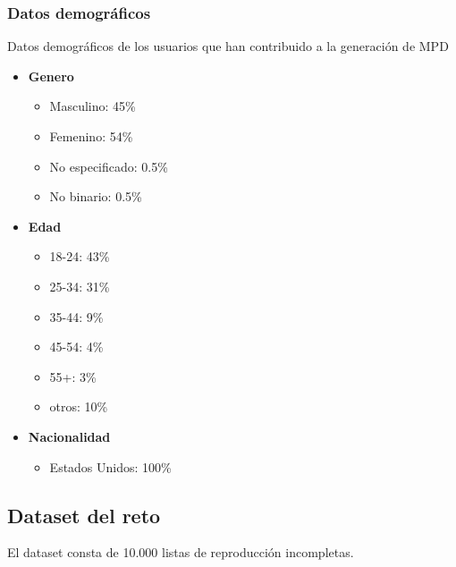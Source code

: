 \documentclass{article}
\begin{document}
	\subsubsection{Datos demográficos}
	Datos demográficos de los usuarios que han contribuido a la generación de MPD
	\begin{itemize}
		\item \textbf{Genero}
		\begin{itemize}
			\item Masculino: 45\%
			\item Femenino: 54\%
			\item No especificado: 0.5\%
			\item No binario: 0.5\%
		\end{itemize}
		\item \textbf{Edad}
		\begin{itemize}
			\item 18-24: 43\%
			\item 25-34: 31\%
			\item 35-44: 9\%
			\item 45-54: 4\%
			\item 55+: 3\%
			\item otros: 10\%
		\end{itemize}
		\item \textbf{Nacionalidad}
		\begin{itemize}
			\item Estados Unidos: 100\%
		\end{itemize}
	\end{itemize}
	 
	\subsection{Dataset del reto}
	El dataset consta de 10.000 listas de reproducción incompletas.
\end{document}
